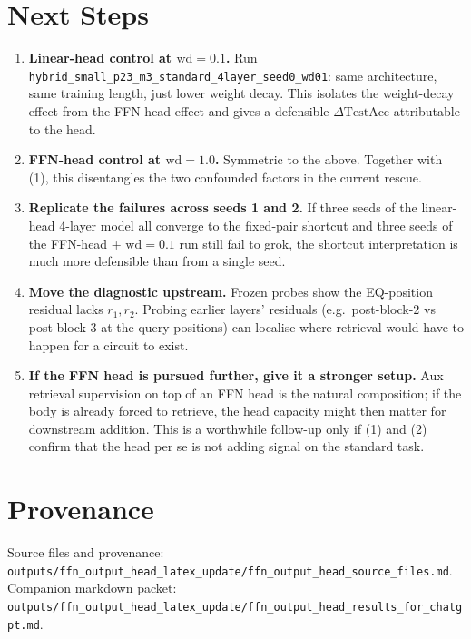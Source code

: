 \documentclass[10pt]{article}
\begin{document}
\section{Next Steps}

\begin{enumerate}
\item \textbf{Linear-head control at $\mathrm{wd}=0.1$.} Run \texttt{hybrid\_small\_p23\_m3\_standard\_4layer\_seed0\_wd01}: same architecture, same training length, just lower weight decay. This isolates the weight-decay effect from the FFN-head effect and gives a defensible $\Delta\mathrm{TestAcc}$ attributable to the head.
\item \textbf{FFN-head control at $\mathrm{wd}=1.0$.} Symmetric to the above. Together with (1), this disentangles the two confounded factors in the current rescue.
\item \textbf{Replicate the failures across seeds 1 and 2.} If three seeds of the linear-head 4-layer model all converge to the fixed-pair shortcut and three seeds of the FFN-head + $\mathrm{wd}=0.1$ run still fail to grok, the shortcut interpretation is much more defensible than from a single seed.
\item \textbf{Move the diagnostic upstream.} Frozen probes show the EQ-position residual lacks $r_1, r_2$. Probing earlier layers' residuals (e.g.\ post-block-2 vs post-block-3 at the query positions) can localise where retrieval would have to happen for a circuit to exist.
\item \textbf{If the FFN head is pursued further, give it a stronger setup.} Aux retrieval supervision on top of an FFN head is the natural composition; if the body is already forced to retrieve, the head capacity might then matter for downstream addition. This is a worthwhile follow-up only if (1) and (2) confirm that the head per se is not adding signal on the standard task.
\end{enumerate}

\section*{Provenance}

Source files and provenance: \texttt{outputs/ffn\_output\_head\_latex\_update/ffn\_output\_head\_source\_files.md}. Companion markdown packet: \texttt{outputs/ffn\_output\_head\_latex\_update/ffn\_output\_head\_results\_for\_chatgpt.md}.
\end{document}
